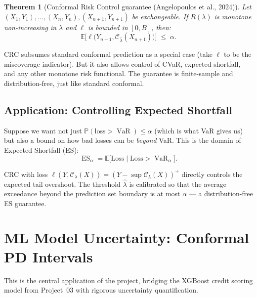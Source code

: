 \documentclass[11pt, a4paper]{article}
\theoremstyle{definition}
\theoremstyle{plain}
\newtheorem{theorem}{Theorem}[section]
\theoremstyle{remark}
\newcommand{\VaR}{\operatorname{VaR}}
\newcommand{\ES}{\operatorname{ES}}
\newcommand{\EV}{\mathbb{E}}
\newcommand{\PV}{\mathbb{P}}
\newcommand{\Ccal}{\mathcal{C}}
\begin{document}
\begin{theorem}[Conformal Risk Control guarantee (Angelopoulos et al., 2024)]
\label{thm:crc}
Let $(X_1, Y_1), \ldots, (X_n, Y_n), (X_{n+1}, Y_{n+1})$ be exchangeable.
If $R(\lambda)$ is monotone non-increasing in $\lambda$ and $\ell$ is bounded
in $[0, B]$, then:
\begin{equation}\label{eq:crc-guarantee}
    \EV\bigl[\ell\bigl(Y_{n+1}, \Ccal_{\hat{\lambda}}(X_{n+1})\bigr)\bigr]
    \;\leq\; \alpha.
\end{equation}
\end{theorem}

\begin{keyresult}
CRC subsumes standard conformal prediction as a special case (take $\ell$ to be the
miscoverage indicator).
But it also allows control of CVaR, expected shortfall, and any other monotone risk
functional.
The guarantee is finite-sample and distribution-free, just like standard conformal.
\end{keyresult}

\subsection{Application: Controlling Expected Shortfall}

Suppose we want not just $\PV(\text{loss} > \VaR) \leq \alpha$ (which is what
VaR gives us) but also a bound on how bad losses can be \emph{beyond} VaR.
This is the domain of Expected Shortfall (ES):
\begin{equation}
    \ES_\alpha = \EV\bigl[\text{Loss} \mid \text{Loss} > \VaR_\alpha\bigr].
\end{equation}

CRC with loss $\ell(Y, \Ccal_\lambda(X)) = (Y - \sup \Ccal_\lambda(X))^+$
directly controls the expected tail overshoot.
The threshold $\hat{\lambda}$ is calibrated so that the average exceedance
beyond the prediction set boundary is at most $\alpha$ --- a distribution-free
ES guarantee.


\section{ML Model Uncertainty: Conformal PD Intervals}
\label{sec:conformal-pd}

This is the central application of the project, bridging the XGBoost credit
scoring model from Project~03 with rigorous uncertainty quantification.
\end{document}
